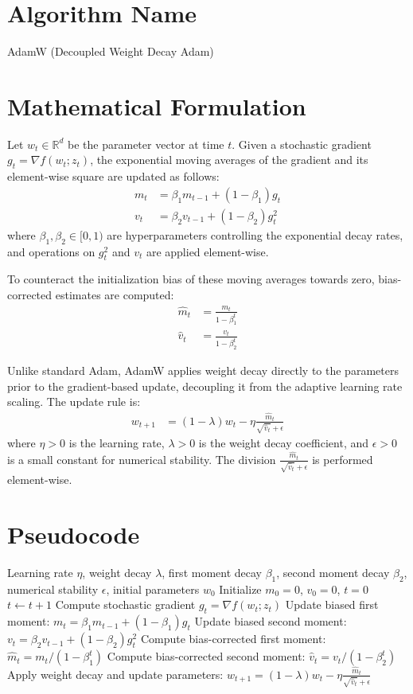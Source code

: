 \documentclass{article}
\begin{document}
\section*{Algorithm Name}
AdamW (Decoupled Weight Decay Adam)

\section*{Mathematical Formulation}
Let $w_t \in \mathbb{R}^d$ be the parameter vector at time $t$. Given a stochastic gradient $g_t = \nabla f(w_t; z_t)$, the exponential moving averages of the gradient and its element-wise square are updated as follows:
\begin{align}
m_t &= \beta_1 m_{t-1} + (1-\beta_1) g_t \\
v_t &= \beta_2 v_{t-1} + (1-\beta_2) g_t^2
\end{align}
where $\beta_1, \beta_2 \in [0, 1)$ are hyperparameters controlling the exponential decay rates, and operations on $g_t^2$ and $v_t$ are applied element-wise. 

To counteract the initialization bias of these moving averages towards zero, bias-corrected estimates are computed:
\begin{align}
\hat{m}_t &= \frac{m_t}{1-\beta_1^t} \\
\hat{v}_t &= \frac{v_t}{1-\beta_2^t}
\end{align}

Unlike standard Adam, AdamW applies weight decay directly to the parameters prior to the gradient-based update, decoupling it from the adaptive learning rate scaling. The update rule is:
\begin{align}
w_{t+1} &= (1 - \lambda) w_t - \eta \frac{\hat{m}_t}{\sqrt{\hat{v}_t} + \epsilon}
\end{align}
where $\eta > 0$ is the learning rate, $\lambda > 0$ is the weight decay coefficient, and $\epsilon > 0$ is a small constant for numerical stability. The division $\frac{\hat{m}_t}{\sqrt{\hat{v}_t} + \epsilon}$ is performed element-wise.

\section*{Pseudocode}
\begin{algorithmic}[1]
\Require Learning rate $\eta$, weight decay $\lambda$, first moment decay $\beta_1$, second moment decay $\beta_2$, numerical stability $\epsilon$, initial parameters $w_0$
\State Initialize $m_0 = 0$, $v_0 = 0$, $t = 0$
    \State $t \leftarrow t + 1$
    \State Compute stochastic gradient $g_t = \nabla f(w_t; z_t)$
    \State Update biased first moment: $m_t = \beta_1 m_{t-1} + (1-\beta_1) g_t$
    \State Update biased second moment: $v_t = \beta_2 v_{t-1} + (1-\beta_2) g_t^2$
    \State Compute bias-corrected first moment: $\hat{m}_t = m_t / (1-\beta_1^t)$
    \State Compute bias-corrected second moment: $\hat{v}_t = v_t / (1-\beta_2^t)$
    \State Apply weight decay and update parameters: $w_{t+1} = (1 - \lambda) w_t - \eta \frac{\hat{m}_t}{\sqrt{\hat{v}_t} + \epsilon}$
\EndWhile
\end{algorithmic}
\end{document}
